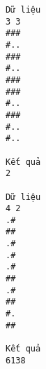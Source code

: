 \begin{verbatim}
Dữ liệu
3 3
###
#..
###
#..
###
###
#..
###
#..
#..	

Kết quả
2

Dữ liệu
4 2
.#
##
.#
.#
.#
##
.#
##
#.
##	

Kết quả
6138
\end{verbatim}